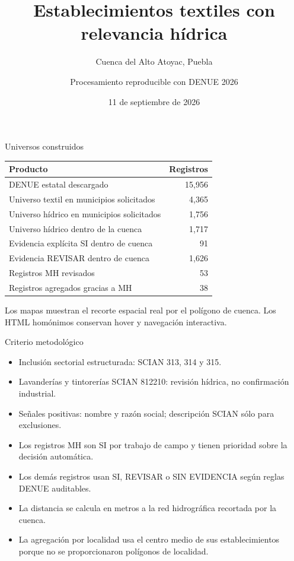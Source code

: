 \documentclass[aspectratio=169]{beamer}
\title{Establecimientos textiles con relevancia hídrica}
\subtitle{Cuenca del Alto Atoyac, Puebla}
\author{Procesamiento reproducible con DENUE 2026}
\date{11 de septiembre de 2026}
\begin{document}
\begin{frame}\titlepage\end{frame}
\begin{frame}{Universos construidos}
\centering
\begin{tabular}{lr}\toprule
Producto & Registros\\\midrule
DENUE estatal descargado & 15,956\\
Universo textil en municipios solicitados & 4,365\\
Universo hídrico en municipios solicitados & 1,756\\
Universo hídrico dentro de la cuenca & 1,717\\
Evidencia explícita SI dentro de cuenca & 91\\
Evidencia REVISAR dentro de cuenca & 1,626\\
Registros MH revisados & 53\\
Registros agregados gracias a MH & 38\\
\bottomrule\end{tabular}
\vfill
Los mapas muestran el recorte espacial real por el polígono de cuenca. Los HTML homónimos conservan hover y navegación interactiva.
\end{frame}
\begin{frame}{Criterio metodológico}
\begin{itemize}
\item Inclusión sectorial estructurada: SCIAN 313, 314 y 315.
\item Lavanderías y tintorerías SCIAN 812210: revisión hídrica, no confirmación industrial.
\item Señales positivas: nombre y razón social; descripción SCIAN sólo para exclusiones.
\item Los registros MH son SI por trabajo de campo y tienen prioridad sobre la decisión automática.
\item Los demás registros usan SI, REVISAR o SIN EVIDENCIA según reglas DENUE auditables.
\item La distancia se calcula en metros a la red hidrográfica recortada por la cuenca.
\item La agregación por localidad usa el centro medio de sus establecimientos porque no se proporcionaron polígonos de localidad.
\end{itemize}
\end{frame}
\end{document}
